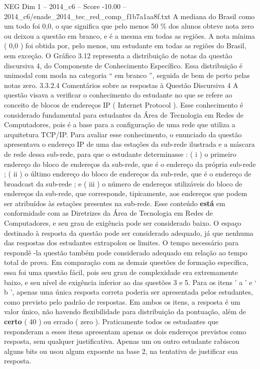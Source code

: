 \begin{textsample}{NEG Dim 1 – 2014\_c6 – Score -10.00 – 2014\_c6/enade\_2014\_tec\_red\_comp\_f1b7a1aa8f.txt}
A mediana do Brasil como um todo foi 0,0, o que significa que pelo menos 50 \% dos alunos obteve nota zero ou deixou a questão em branco, e é a mesma em todas as regiões.
A nota mínima ( 0,0 ) foi obtida por, pelo menos, um estudante em todas as regiões do Brasil, sem exceção.
O Gráfico 3.12 representa a distribuição de notas da questão discursiva 4, do Componente de Conhecimento Específico.
Essa distribuição é unimodal com moda na categoria “ em branco ”, seguida de bem de perto pelas notas zero. 3.3.2.4 Comentários sobre as respostas à Questão Discursiva 4 A questão visava a verificar o conhecimento do estudante no que se refere ao conceito de blocos de endereços IP ( Internet Protocol ).
Esse conhecimento é considerado fundamental para estudantes da Área de Tecnologia em Redes de Computadores, pois é a base para a configuração de uma rede que utiliza a arquitetura TCP/IP.
Para avaliar esse conhecimento, o enunciado da questão apresentava o endereço IP de uma das estações da sub-rede ilustrada e a máscara de rede dessa sub-rede, para que o estudante determinasse : ( i ) o primeiro endereço do bloco de endereços da sub-rede, que é o endereço da própria sub-rede ; ( ii ) o último endereço do bloco de endereços da sub-rede, que é o endereço de broadcast da sub-rede ; e ( iii ) o número de endereços utilizáveis do bloco de endereços da sub-rede, que corresponde, tipicamente, aos endereços que podem ser atribuídos às estações presentes na sub-rede.
Esse conteúdo \textbf{está} em conformidade com as Diretrizes da Área de Tecnologia em Redes de Computadores, e seu grau de exigência pode ser considerado baixo.
O espaço destinado à resposta da questão pode ser considerado adequado, já que nenhuma das respostas dos estudantes extrapolou os limites.
O tempo necessário para respondê -la questão também pode considerado adequado em relação ao tempo total de prova.
Em comparação com as demais questões de formação específica, essa foi uma questão fácil, pois seu grau de complexidade era extremamente baixo, e seu nível de exigência inferior ao das questões 3 e 5.
Para os itens ’ a ’ e ‘ b ’, apenas uma única resposta correta poderia ser apresentada pelos estudantes, como previsto pelo padrão de respostas.
Em ambos os itens, a resposta é um valor único, não havendo flexibilidade para distribuição da pontuação, além de \textbf{certo} ( 40 ) ou errado ( zero ).
Praticamente todos os estudantes que responderam a esses itens apresentam apenas os dois endereços previstos como resposta, sem qualquer justificativa.
Apenas um ou outro estudante rabiscou alguns bits ou usou algum expoente na base 2, na tentativa de justificar sua resposta.

\end{textsample}
